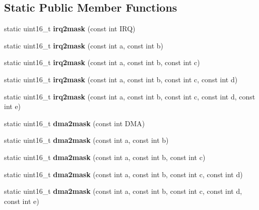 \subsection*{Static Public Member Functions}
\begin{DoxyCompactItemize}
\item 
\hypertarget{classISAPnPDevice_a9b4802d3c716b3b4feb93794b40e764e}{static uint16\-\_\-t {\bfseries irq2mask} (const int I\-R\-Q)}\label{classISAPnPDevice_a9b4802d3c716b3b4feb93794b40e764e}

\item 
\hypertarget{classISAPnPDevice_a21b88cff8bc7228ce6e10531191c0760}{static uint16\-\_\-t {\bfseries irq2mask} (const int a, const int b)}\label{classISAPnPDevice_a21b88cff8bc7228ce6e10531191c0760}

\item 
\hypertarget{classISAPnPDevice_a60d190dd19c6f23eaaaf84a2158dbfdf}{static uint16\-\_\-t {\bfseries irq2mask} (const int a, const int b, const int c)}\label{classISAPnPDevice_a60d190dd19c6f23eaaaf84a2158dbfdf}

\item 
\hypertarget{classISAPnPDevice_a25a884a366ba921386ac6e6046f36464}{static uint16\-\_\-t {\bfseries irq2mask} (const int a, const int b, const int c, const int d)}\label{classISAPnPDevice_a25a884a366ba921386ac6e6046f36464}

\item 
\hypertarget{classISAPnPDevice_a0a4724182451944a2633623bad5b2e55}{static uint16\-\_\-t {\bfseries irq2mask} (const int a, const int b, const int c, const int d, const int e)}\label{classISAPnPDevice_a0a4724182451944a2633623bad5b2e55}

\item 
\hypertarget{classISAPnPDevice_a4d861db3b14dc9a02fdd1b82c9938e95}{static uint16\-\_\-t {\bfseries dma2mask} (const int D\-M\-A)}\label{classISAPnPDevice_a4d861db3b14dc9a02fdd1b82c9938e95}

\item 
\hypertarget{classISAPnPDevice_a35279503ac439495c169df4aa47858aa}{static uint16\-\_\-t {\bfseries dma2mask} (const int a, const int b)}\label{classISAPnPDevice_a35279503ac439495c169df4aa47858aa}

\item 
\hypertarget{classISAPnPDevice_a729b731c72134ca11fd602f2a1d34ccf}{static uint16\-\_\-t {\bfseries dma2mask} (const int a, const int b, const int c)}\label{classISAPnPDevice_a729b731c72134ca11fd602f2a1d34ccf}

\item 
\hypertarget{classISAPnPDevice_aa9924d275ddbe6748a6001ae774c15d0}{static uint16\-\_\-t {\bfseries dma2mask} (const int a, const int b, const int c, const int d)}\label{classISAPnPDevice_aa9924d275ddbe6748a6001ae774c15d0}

\item 
\hypertarget{classISAPnPDevice_a2eaa62bfc96b953b6d2d31aeb1d5ec2d}{static uint16\-\_\-t {\bfseries dma2mask} (const int a, const int b, const int c, const int d, const int e)}\label{classISAPnPDevice_a2eaa62bfc96b953b6d2d31aeb1d5ec2d}

\end{DoxyCompactItemize}
